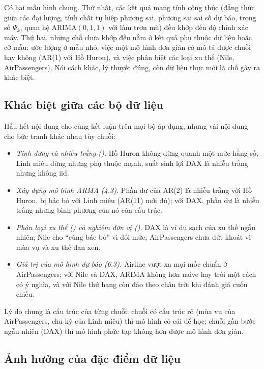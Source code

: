 Có hai mẫu hình chung. Thứ nhất, các kết quả mang tính công thức (đẳng thức giữa các đại lượng, tính chất tự hiệp phương sai, phương sai sai số dự báo, trọng số $\Psi_k$, quan hệ ARIMA$(0,1,1)$ với làm trơn mũ) đều khớp đến độ chính xác máy. Thứ hai, những chỗ chưa khớp đều nằm ở kết quả phụ thuộc dữ liệu hoặc cỡ mẫu: ước lượng ở mẫu nhỏ, việc một mô hình đơn giản có mô tả được chuỗi hay không (AR(1) với Hồ Huron), và việc phân biệt các loại xu thế (Nile, AirPassengers). Nói cách khác, lý thuyết đúng, còn dữ liệu thực mới là chỗ gây ra khác biệt.

\subsection{Khác biệt giữa các bộ dữ liệu}

Hầu hết nội dung cho cùng kết luận trên mọi bộ áp dụng, nhưng vài nội dung cho bức tranh khác nhau tùy chuỗi:
\begin{itemize}[leftmargin=*,itemsep=2pt]
\item \emph{Tính dừng và nhiễu trắng ().} Hồ Huron không dừng quanh một mức hằng số, Linh miêu dừng nhưng phụ thuộc mạnh, suất sinh lợi DAX là nhiễu trắng nhưng không iid.
\item \emph{Xây dựng mô hình ARMA (4.3).} Phần dư của AR(2) là nhiễu trắng với Hồ Huron, bị bác bỏ với Linh miêu (AR(11) mới đủ); với DAX, phần dư là nhiễu trắng nhưng bình phương của nó còn cấu trúc.
\item \emph{Phân loại xu thế () và nghiệm đơn vị ().} DAX là ví dụ sạch của xu thế ngẫu nhiên; Nile cho ``cùng bác bỏ'' vì đổi mức; AirPassengers chưa dứt khoát vì mùa vụ và xu thế đan xen.
\item \emph{Giá trị của mô hình dự báo (6.3).} Airline vượt xa mọi mốc chuẩn ở AirPassengers; với Nile và DAX, ARIMA không hơn naive hay trôi một cách có ý nghĩa, và với Nile thứ hạng còn đảo theo chân trời khi đánh giá cuốn chiếu.
\end{itemize}
Lý do chung là cấu trúc của từng chuỗi: chuỗi có cấu trúc rõ (mùa vụ của AirPassengers, chu kỳ của Linh miêu) thì mô hình có cái để học; chuỗi gần bước ngẫu nhiên (DAX) thì mô hình phức tạp không hơn được mô hình đơn giản.

\subsection{Ảnh hưởng của đặc điểm dữ liệu}

